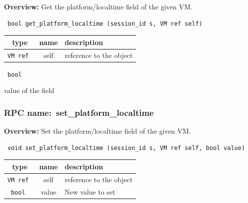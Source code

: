 {\bf Overview:} 
Get the platform/localtime field of the given VM.

\begin{verbatim} bool get_platform_localtime (session_id s, VM ref self)\end{verbatim}



 
\vspace{0.3cm}
\begin{tabular}{|c|c|p{7cm}|}
 \hline
{\bf type} & {\bf name} & {\bf description} \\ \hline
{\tt VM ref } & self & reference to the object \\ \hline 

\end{tabular}

\vspace{0.3cm}

{\tt 
bool
}


value of the field
\vspace{0.3cm}
\vspace{0.3cm}
\vspace{0.3cm}
\subsubsection{RPC name:~set\_platform\_localtime}

{\bf Overview:} 
Set the platform/localtime field of the given VM.

\begin{verbatim} void set_platform_localtime (session_id s, VM ref self, bool value)\end{verbatim}



 
\vspace{0.3cm}
\begin{tabular}{|c|c|p{7cm}|}
 \hline
{\bf type} & {\bf name} & {\bf description} \\ \hline
{\tt VM ref } & self & reference to the object \\ \hline 

{\tt bool } & value & New value to set \\ \hline 

\end{tabular}

\vspace{0.3cm}

